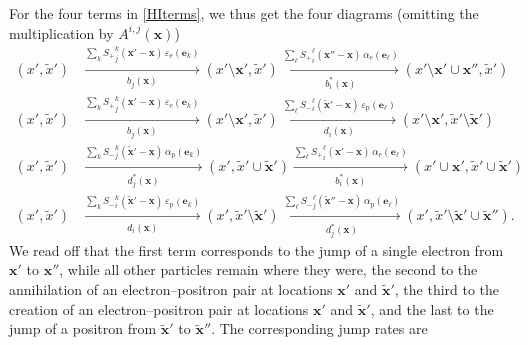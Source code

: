 \documentclass[12pt]{article}
\newcommand{\1}{\mathbf{1}} %
\newcommand{\Dindex}{i} %
\newcommand{\Dindextwo}{j} %
\newcommand{\Dindexthree}{k}
\newcommand{\Dindexfour}{\ell}
\newcommand{\ve}{{\boldsymbol e}}
\newcommand{\vx}{{\boldsymbol x}} %
\newcommand{\pvx}{{\widetilde{\vx}}}
\newcommand{\px}{{\widetilde{x}}}
\newcommand{\el}{\mathrm{e}} %
\newcommand{\pos}{\mathrm{p}} %
\begin{document}
For the four terms in \eqref{HIterms}, we thus get the four diagrams
(omitting the multiplication by $A^{\Dindex,\Dindextwo}(\vx)$)
\begin{subequations}
\begin{align}
   (x',\px') &\xrightarrow [b_\Dindextwo(\vx)] {\sum_\Dindexthree
   {S_+}^{\Dindexthree}_{\Dindextwo} (\vx' - \vx) \,
   \varepsilon_\el(\ve_\Dindexthree)} (x'\setminus \vx',\px') 
\xrightarrow
   [b^*_\Dindex(\vx)] {\sum_\Dindexfour {S_+}^{\Dindexfour}_{\Dindex}
   (\vx'' - \vx) \, \alpha_\el(\ve_\Dindexfour)} (x'\setminus \vx' \cup
   \vx'',\px') \\
   (x',\px') &\xrightarrow [b_\Dindextwo(\vx)] {\sum_\Dindexthree
   {S_+}^{\Dindexthree}_{\Dindextwo} (\vx' - \vx) \,
   \varepsilon_\el(\ve_\Dindexthree)} (x'\setminus \vx',\px') 
\xrightarrow
   [d_\Dindex(\vx)] {\sum_\Dindexfour {S_-}^{\Dindexfour}_{\Dindex}
   (\pvx' - \vx) \, \varepsilon_\pos(\ve_\Dindexfour)} (x'\setminus
   \vx',\px'\setminus \pvx')\\
   (x',\px') &\xrightarrow [d^*_\Dindextwo(\vx)] {\sum_\Dindexthree
   {S_-}^{\Dindexthree}_{\Dindextwo} (\pvx' - \vx) \,
   \alpha_\pos(\ve_\Dindexthree)} (x',\px'\cup \pvx') \xrightarrow
   [b^*_\Dindex(\vx)] {\sum_\Dindexfour {S_+}^{\Dindexfour}_{\Dindex}
   (\vx' - \vx) \, \alpha_\el(\ve_\Dindexfour)} (x'\cup \vx',\px' \cup
   \pvx')\\
   (x',\px') &\xrightarrow [d_\Dindex(\vx)] {\sum_\Dindexthree
   {S_-}^{\Dindexthree}_{\Dindex} (\pvx' - \vx) \,
   \varepsilon_\pos(\ve_\Dindexthree)} (x',\px'\setminus \pvx')
\xrightarrow
   [d^*_\Dindextwo(\vx)] {\sum_\Dindexfour
   {S_-}^{\Dindexfour}_{\Dindextwo} (\pvx'' - \vx) \,
   \alpha_\pos(\ve_\Dindexfour)} (x',\px'\setminus \pvx' \cup \pvx'').
\end{align}
\end{subequations}
We read off that the first term corresponds to the jump of a single
electron from $\vx'$ to $\vx''$, while all other particles remain
where they were, the second to the annihilation of an
electron--positron pair at locations $\vx'$ and $\pvx'$, the third to
the creation of an electron--positron pair at locations $\vx'$ and
$\pvx'$, and the last to the jump of a positron from $\pvx'$ to
$\pvx''$.  The corresponding jump rates are
\end{document}
